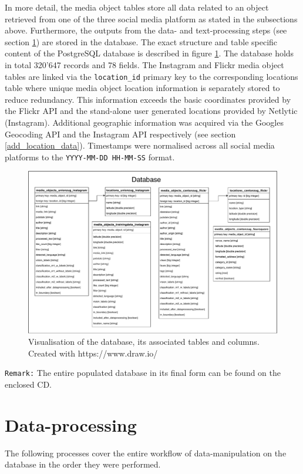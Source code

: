 In more detail, the media object tables store all data related to an object retrieved from one of the three social media platform as stated in the subsections above. Furthermore, the outputs from the data- and text-processing steps (see section \ref{data_processing}) are stored in the database. The exact structure and table specific content of the PostgreSQL database is described in figure \ref{fig:database}. The database holds in total 320'647 records and 78 fields. The Instagram and Flickr media object tables are linked via the \texttt{location\_id} primary key to the corresponding locations table where unique media object location information is separately stored to reduce redundancy. This information exceeds the basic coordinates provided by the Flickr API and the stand-alone user generated locations provided by Netlytic (Instagram). Additional geographic information was acquired via the Googles Geocoding API and the Instagram API respectively (see section \ref{add_location_data}). Timestamps were normalised across all social media platforms to the \texttt{YYYY-MM-DD HH-MM-SS} format. \\

\begin{figure}[h]
   \centering
   \includegraphics[width=\textwidth]{img/fusion_db_overview}
   \caption{Visualisation of the database, its associated tables and columns. \\ Created with https://www.draw.io/}
   \label{fig:database}
\end{figure}

\texttt{Remark:} The entire populated database in its final form can be found on the enclosed CD.

\section{Data-processing} \label{data_processing}
The following processes cover the entire workflow of data-manipulation on the database in the order they were performed.

